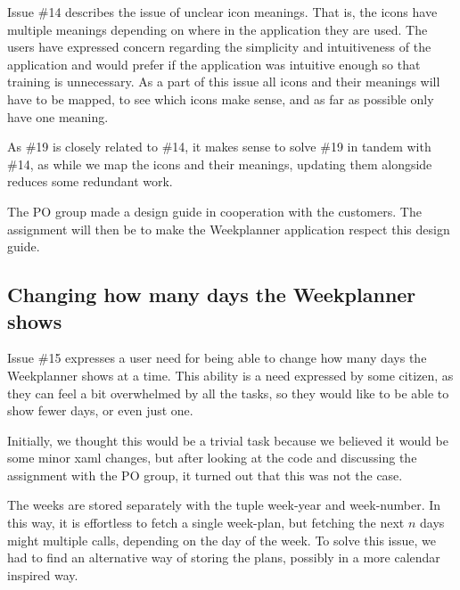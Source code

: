 Issue \#14 describes the issue of unclear icon meanings. That is, the icons have multiple meanings depending on where in the application they are used. The users have expressed concern regarding the simplicity and intuitiveness of the application and would prefer if the application was intuitive enough so that training is unnecessary. As a part of this issue all icons and their meanings will have to be mapped, to see which icons make sense, and as far as possible only have one meaning. 

As \#19 is closely related to \#14, it makes sense to solve \#19 in tandem with \#14, as while we map the icons and their meanings, updating them alongside reduces some redundant work.

The \gls{PO} group made a design guide in cooperation with the customers. The assignment will then be to make the Weekplanner application respect this design guide.

\subsection{Changing how many days the Weekplanner shows} \label{sec:weekPlannerDaysToShow}

Issue \#15 expresses a user need for being able to change how many days the Weekplanner shows at a time. This ability is a need expressed by some citizen, as they can feel a bit overwhelmed by all the tasks, so they would like to be able to show fewer days, or even just one.

Initially, we thought this would be a trivial task because we believed it would be some minor \gls{xaml} changes, but after looking at the code and discussing the assignment with the \gls{PO} group, it turned out that this was not the case. 

The weeks are stored separately with the tuple week-year and week-number. In this way, it is effortless to fetch a single week-plan, but fetching the next $n$ days might multiple calls, depending on the day of the week. To solve this issue, we had to find an alternative way of storing the plans, possibly in a more calendar inspired way.
